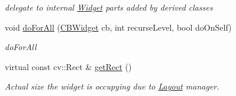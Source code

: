 \begin{DoxyCompactItemize}
\begin{DoxyCompactList}\small\item\em delegate to internal \hyperlink{classcanvascv_1_1Widget}{Widget} parts added by derived classes \end{DoxyCompactList}\item 
void \hyperlink{classcanvascv_1_1CompoundWidget_aa7d0f488468fca5707aa49ea35e9c67e}{do\+For\+All} (\hyperlink{classcanvascv_1_1Widget_ad27bca771ee1c14454c77c91d9d49925}{C\+B\+Widget} cb, int recurse\+Level, bool do\+On\+Self)
\begin{DoxyCompactList}\small\item\em do\+For\+All \end{DoxyCompactList}\item 
virtual const cv\+::\+Rect \& \hyperlink{classcanvascv_1_1CompoundWidget_a5dd95e74613437ed56821b8ae796d64f}{get\+Rect} ()\hypertarget{classcanvascv_1_1CompoundWidget_a5dd95e74613437ed56821b8ae796d64f}{}\label{classcanvascv_1_1CompoundWidget_a5dd95e74613437ed56821b8ae796d64f}

\begin{DoxyCompactList}\small\item\em Actual size the widget is occupying due to \hyperlink{classcanvascv_1_1Layout}{Layout} manager. \end{DoxyCompactList}\end{DoxyCompactItemize}

